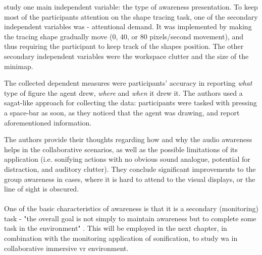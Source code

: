 \cite{gutwin_chalk_2011} study one main independent variable: the type of awareness presentation. To keep most of the participants attention on the shape tracing task, one of the secondary independent variables was - attentional demand. It was implemented by making the tracing shape gradually move (0, 40, or 80 pixels/second movement), and thus requiring the participant to keep track of the shapes position. The other secondary independent variables were the workspace clutter and the size of the minimap.

The collected dependent measures were participants' accuracy in reporting \textit{what }type of figure the agent drew, \textit{where }and \textit{when }it drew it.
The authors used a \gls{sagat}-like approach for collecting the data: participants were tasked with pressing a space-bar as soon, as they noticed that the agent was drawing, and report aforementioned information.

The authors provide their thoughts regarding how and why the audio awareness helps in the collaborative scenarios, as well as the possible limitations of its application (i.e. sonifying actions with no obvious sound analogue, potential for distraction, and auditory clutter). They conclude significant improvements to the group awareness in cases, where it is hard to attend to the visual displays, or the line of sight is obscured.


\paragraph[Bridge to experiments]{}
One of the basic characteristics of awareness is that it is a secondary (monitoring) task - "the overall goal is not simply to maintain awareness but to complete some task in the environment" \cite{gutwin_descriptive_2002}. This will be employed in the next chapter, in combination with the monitoring application of sonification, to study \gls{wa} in collaborative immersive \gls{vr} environment.